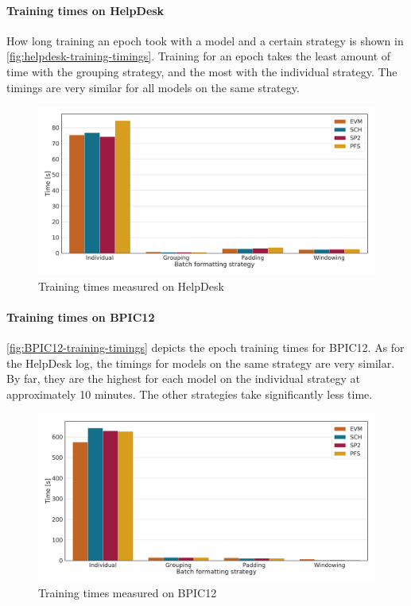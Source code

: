 \paragraph{Training times on HelpDesk}
How long training an epoch took with a model and a certain strategy is shown in \autoref{fig:helpdesk-training-timings}.
Training for an epoch takes the least amount of time with the grouping strategy, and the most with the individual strategy.
The timings are very similar for all models on the same strategy.

\begin{figure}[!htb]
    \centering
    \includegraphics[width=\textwidth]{gfx/helpdesk/train_timings.pdf}
    \caption{Training times measured on HelpDesk}
    \label{fig:helpdesk-training-timings}
\end{figure}

\paragraph{Training times on BPIC12}
\autoref{fig:BPIC12-training-timings} depicts the epoch training times for BPIC12.
As for the HelpDesk log, the timings for models on the same strategy are very similar.
By far, they are the highest for each model on the individual strategy at approximately 10 minutes.
The other strategies take significantly less time.

\begin{figure}[!htb]
    \centering
    \includegraphics[width=\textwidth]{gfx/bpic2012/train_timings.pdf}
    \caption{Training times measured on BPIC12}
    \label{fig:BPIC12-training-timings}
\end{figure}

